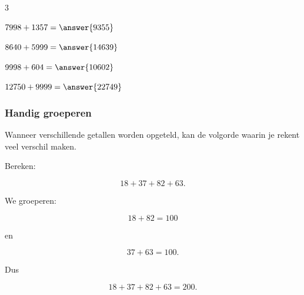\documentclass{ximera}
\begin{document}
\begin{oefening}{\oefB\ESS}
\begin{multicols}{3}
    \begin{question} \(7998+1357=\answer{9355}\) \end{question}
    
    \begin{question} \(8640+5999=\answer{14639}\) \end{question}
    
    \begin{question} \(9998+604=\answer{10602}\) \end{question}
    
    \begin{question} \(12750+9999=\answer{22749}\) \end{question}
    
    \end{multicols}
    
    \end{oefening}



\subsubsection*{Handig groeperen}

Wanneer verschillende getallen worden opgeteld, kan de volgorde waarin je
rekent veel verschil maken.

\begin{voorbeeld}

Bereken:

\[
18+37+82+63.
\]

We groeperen:

\[
18+82=100
\]

en

\[
37+63=100.
\]

Dus

\[
18+37+82+63=200.
\]

\end{voorbeeld}
\end{document}
